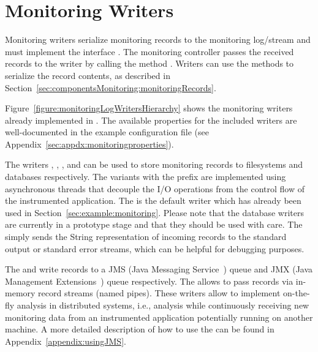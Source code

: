 \section{Monitoring Writers}\label{sec:monitoring-log-writers}

Monitoring writers serialize monitoring records to the monitoring log/stream and  %
must implement the interface . The monitoring %
controller passes the received records to the writer by calling the method %
. Writers can use the methods to serialize the %
record contents, as described in Section~\ref{sec:componentsMonitoring:monitoringRecords}.

Figure~\ref{figure:monitoringLogWritersHierarchy} shows the monitoring writers %
already implemented in \KiekerMonitoringPart{}. The available properties for the %
included writers are well-documented in the %
example configuration file (see Appendix~\ref{sec:appdx:monitoringproperties}). %


The writers , %
, , and  can be used %
to store monitoring records to filesystems and databases respectively. %
The variants with the prefix  are implemented using asynchronous %
threads that decouple the I/O operations from the control flow of the %
instrumented application. %
The  is the default writer which has already been used in %
Section~\ref{sec:example:monitoring}. %
Please note that the database writers are currently in a prototype stage and
that they should be used with care. %
The  simply sends the String representation of incoming %
records to the standard output or standard error streams, which can be helpful %
for debugging purposes.

The  and  write records to a JMS %
(Java Messaging Service~\cite{JMS-WebSite}) queue and JMX (Java Management %
Extensions~\cite{JMX-Website}) queue respectively. The  %
allows to pass records via in-memory record streams (named pipes). %
These writers allow to implement on-the-fly analysis in distributed systems, i.e., analysis while %
continuously receiving new monitoring data from an instrumented application potentially %
running on another machine. A more detailed description of how to use the  %
can be found in Appendix~\ref{appendix:usingJMS}. %

